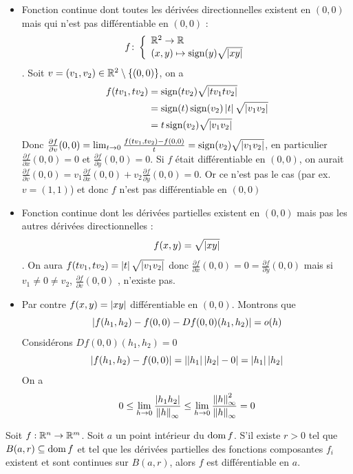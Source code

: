 \begin{exemple}
\begin{itemize}
    \item Fonction continue dont toutes les dérivées directionnelles existent en $(0,0)$ mais qui n'est pas différentiable en $(0,0)$ : 
    $$f\colon \left\{\begin{array}{l}\mathbb{R}^2\to \mathbb{R} \\(x,y)\mapsto \operatorname{sign}(y)\sqrt{\left| xy \right|}\end{array}\right.$$. Soit $v=(v_1,v_2)\in\mathbb{R}^2\setminus\{(0,0)\}$, on a \begin{align*}
        f(tv_1,tv_2) &= \operatorname{sign}(tv_2)\sqrt{\left| tv_1tv_2 \right|}\\
        &=\operatorname{sign}(t)\operatorname{sign}(v_2)\left| t \right| \sqrt{\left| v_1v_2 \right|}\\
        &= t\operatorname{sign}(v_2)\sqrt{\left| v_1v_2 \right|}
    \end{align*}
    Donc $\frac{\partial f}{\partial v}(0,0) = \lim_{t\to 0}\frac{f(tv_1,tv_2) - f(0,0)}t = \operatorname{sign}(v_2)\sqrt{\left| v_1v_2 \right|}$, en particulier $\frac{\partial f}{\partial x}(0,0) = 0$ et $\frac{\partial f}{\partial y}(0,0) = 0$. Si $f$ était différentiable en $(0,0)$, on aurait $\frac{\partial f}{\partial v}(0,0) = v_1\frac{\partial f}{\partial x}(0,0) + v_2 \frac{\partial f}{\partial y}(0,0)= 0$. Or ce n'est pas le cas (par ex. $v=(1,1)$) et donc $f$ n'est pas différentiable en $(0,0)$
    \item Fonction continue dont les dérivées partielles existent en $(0,0)$ mais pas les autres dérivées directionnelles : $$
    f(x,y) = \sqrt{\left| xy \right|}$$.
    On aura $f(tv_1,tv_2) = \left| t \right|\sqrt{\left| v_1v_2 \right|}$
    donc $\frac{\partial f}{\partial x}(0,0)=0=\frac{\partial f}{\partial y}(0,0)$ mais si $v_1\neq 0\neq v_2$, $\frac{\partial f}{\partial v}(0,0)$ , n'existe pas.
    \item Par contre $f(x,y)=\left| xy \right|$ différentiable en $(0,0)$. Montrons que 
    \begin{equation*}
        \left| f(h_1,h_2)-f(0,0)-Df(0,0)(h_1,h_2) \right|=o(h)
    \end{equation*}
    Considérons $Df(0,0)(h_1,h_2)=0$
    \begin{equation*}
        \left| f(h_1,h_2)-f(0,0) \right|=\left| \left| h_1 \right|\left| h_2 \right|-0 \right|=\left| h_1 \right|\left| h_2 \right|
    \end{equation*}
    On a
    $$
    0\leq\lim_{h\to 0}\frac{\left| h_1h_2 \right|}{\left\| h \right\|_\infty}\leq \lim_{h\to 0}\frac{\left\| h \right\|^2_\infty}{\left\| h \right\|_\infty} = 0
    $$
\end{itemize}
\end{exemple}
\begin{proposition}
    Soit $f:\mathbb{R}^n\to \mathbb{R}^m$. Soit $a$ un point intérieur du $\operatorname{dom} f$. S'il existe $r>0$ tel que $B(a,r)\subseteq\operatorname{dom} f$ et tel que les dérivées partielles des fonctions composantes $f_i$ existent et sont continues sur $B(a,r)$, alors $f$ est différentiable en $a$.
\end{proposition}
